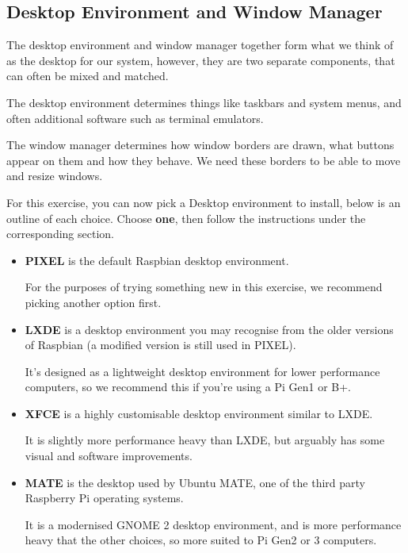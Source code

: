 	\subsection{Desktop Environment and Window Manager}
	
		The desktop environment and window manager together form what we think of as the desktop for our system, however, they are two separate components, that can often be mixed and matched.
		
		The desktop environment determines things like taskbars and system menus, and often additional software such as terminal emulators.
		
		The window manager determines how window borders are drawn, what buttons appear on them and how they behave. We need these borders to be able to move and resize windows.
	
		For this exercise, you can now pick a Desktop environment to install, below is an outline of each choice. Choose \textbf{one}, then follow the instructions under the corresponding section.
		
		\begin{itemize}
			\item \textbf{PIXEL} is the default Raspbian desktop environment.
			
			For the purposes of trying something new in this exercise, we recommend picking another option first.
			
			\item \textbf{LXDE} is a desktop environment you may recognise from the older versions of Raspbian (a modified version is still used in PIXEL).
			
			It's designed as a lightweight desktop environment for lower performance computers, so we recommend this if you're using a Pi Gen1 or B+.
			
			\item \textbf{XFCE} is a highly customisable desktop environment similar to LXDE.
			
			It is slightly more performance heavy than LXDE, but arguably has some visual and software improvements.
			
			\item \textbf{MATE} is the desktop used by Ubuntu MATE, one of the third party Raspberry Pi operating systems.
			
			It is a modernised GNOME 2 desktop environment, and is more performance heavy that the other choices, so more suited to Pi Gen2 or 3 computers.
		\end{itemize}
		
